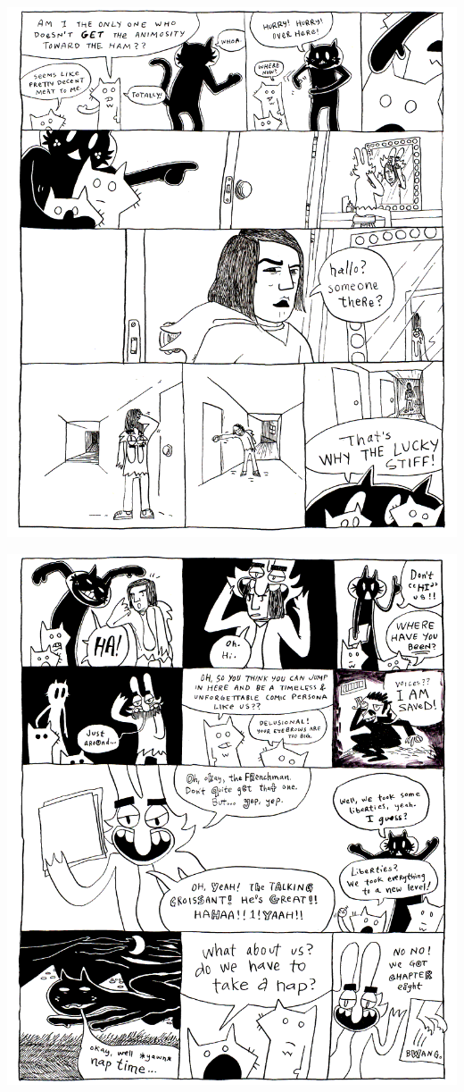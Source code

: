 \documentclass[10pt,twoside]{report}
\begin{document}
\vspace*{0.6cm} \includegraphics[width=1.0\textwidth]{cache/100.png}
\newpage

\vspace*{0.6cm} \includegraphics[width=1.0\textwidth]{cache/101.png}
\newpage
\thispagestyle{empty}
\mbox{}
\newpage
\thispagestyle{empty}
\mbox{}
\end{document}
